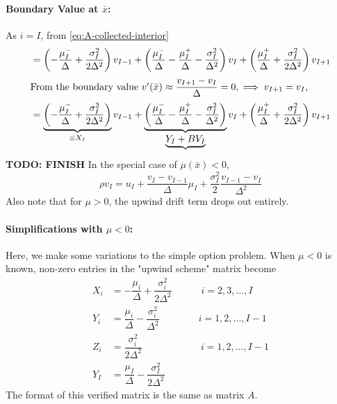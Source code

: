 \documentclass[11pt]{etk-article}
\begin{document}
\paragraph{Boundary Value at $\bar{x}$:}
As $i=I$, from \cref{eq:A-collected-interior}
\begin{align}
&= \left(-\frac{\mu_I^{-}}{\Delta} +\frac{\sigma_I^2}{2\Delta^2}\right)v_{I-1} + \left(\frac{\mu_I^{-}}{\Delta} - \frac{\mu_I^{+}}{\Delta}-\frac{\sigma_I^2}{\Delta^2}\right)v_I + \left(\frac{\mu_I^{+}}{\Delta} + \frac{\sigma_I^2}{2\Delta^2}\right)v_{I+1}\\
\intertext{From the boundary value $v'(\bar{x}) \approx \dfrac{v_{I+1}-v_I}{\Delta} = 0, \implies v_{I+1} = v_I$,}
&= \underbrace{\left(-\frac{\mu_I^{-}}{\Delta} +\frac{\sigma_I^2}{2\Delta^2}\right)}_{\equiv X_I}v_{I-1} + \underbrace{\left(\frac{\mu_I^{-}}{\Delta} - \frac{\mu_I^{+}}{\Delta}-\frac{\sigma_I^2}{\Delta^2}\right)}_{\underbrace{Y_I + BV_I}}v_I + \left(\frac{\mu_I^{+}}{\Delta} + \frac{\sigma_I^2}{2\Delta^2}\right)v_{I+1}
\end{align}
\textbf{TODO: FINISH}
In the special case of $\mu(\bar{x}) < 0$,
\begin{equation}
\rho v_I = u_I + \dfrac{v_I-v_{I-1}}{\Delta} \mu_I + \dfrac{\sigma_I^2}{2} \dfrac{ v_{I-1}-v_I}{\Delta^2}
\end{equation}
Also note that for $\mu > 0$, the upwind drift term drops out entirely.


\paragraph{Simplifications with $\mu < 0$:}
Here, we make some variations to the simple option problem. When $\mu < 0$ is known, non-zero entries in the "upwind scheme" matrix become
\begin{align}
X_i &= -\dfrac{\mu_i}{\Delta} + \dfrac{\sigma_i^2}{2\Delta^2} \qquad \quad  i = 2, 3, ..., I \\
Y_i &= \dfrac{\mu_i}{\Delta} - \dfrac{\sigma_i^2}{\Delta^2} \qquad \qquad   i = 1, 2, ..., I-1 \\
Z_i &= \dfrac{\sigma_i^2}{2\Delta^2} \qquad  \qquad \qquad i = 1, 2, ..., I-1\\
Y_I & = \dfrac{\mu_I}{\Delta} - \dfrac{\sigma_I^2}{2\Delta^2}
\end{align}
The format of this verified matrix is the same as matrix $A$.





\end{document}
